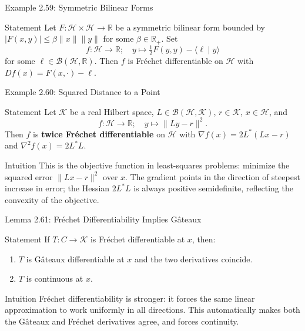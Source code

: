 \documentclass[aspectratio=169,10pt]{beamer}
\newcommand{\R}{\mathbb{R}}
\newcommand{\Hil}{\mathcal{H}}
\newcommand{\Kil}{\mathcal{K}}
\newcommand{\ip}[2]{\langle #1 \mid #2 \rangle}
\begin{document}
\begin{frame}{Example 2.59: Symmetric Bilinear Forms}

  \begin{block}{Statement}
    Let $F: \Hil \times \Hil \to \R$ be a symmetric bilinear form bounded by
    $|F(x,y)| \le \beta \|x\|\|y\|$ for some $\beta \in \R_+$. Set
    \[
      f: \Hil \to \R; \quad y \mapsto \tfrac12 F(y,y) - \ip{\ell}{y}
    \]
    for some $\ell \in \mathcal B(\Hil,\R)$. Then $f$ is Fr\'echet
    differentiable on $\Hil$ with $Df(x) = F(x,\cdot) - \ell$.
  \end{block}

\end{frame}

\begin{frame}{Example 2.60: Squared Distance to a Point}

  \begin{block}{Statement}
    Let $\Kil$ be a real Hilbert space, $L \in \mathcal B(\Hil,\Kil)$,
    $r \in \Kil$, $x \in \Hil$, and
    \[
      f: \Hil \to \R; \quad y \mapsto \|Ly - r\|^2.
    \]
    Then $f$ is \textbf{twice Fr\'echet differentiable} on $\Hil$ with
    $\nabla f(x) = 2L^*(Lx - r)$ and $\nabla^2 f(x) = 2L^*L$.
  \end{block}

  \begin{block}{Intuition}
    This is the objective function in least-squares problems: minimize the
    squared error $\|Lx - r\|^2$ over $x$. The gradient points in the
    direction of steepest increase in error; the Hessian $2L^*L$ is always
    positive semidefinite, reflecting the convexity of the objective.
  \end{block}

\end{frame}

\begin{frame}{Lemma 2.61: Fr\'echet Differentiability Implies G\^ateaux}

  \begin{block}{Statement}
    If $T:C\to\Kil$ is Fr\'echet differentiable at $x$, then:
    \begin{enumerate}
      \item[(i)] $T$ is G\^ateaux differentiable at $x$ and the two
        derivatives coincide.
      \item[(ii)] $T$ is continuous at $x$.
    \end{enumerate}
  \end{block}

  \begin{block}{Intuition}
    Fr\'echet differentiability is stronger: it forces the same linear
    approximation to work uniformly in all directions. This automatically
    makes both the G\^ateaux and Fr\'echet derivatives agree, and forces
    continuity.
  \end{block}

\end{frame}
\end{document}
